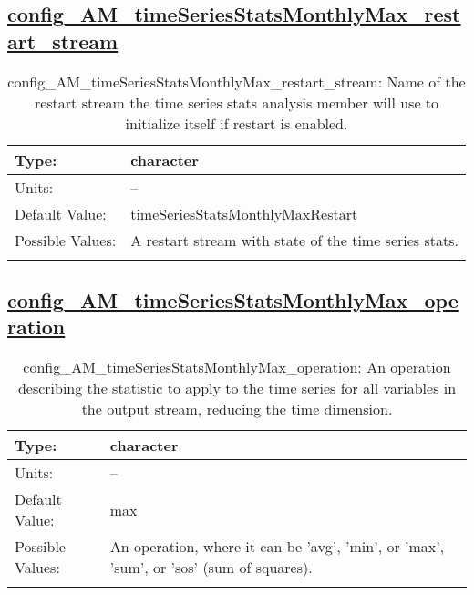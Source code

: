 \subsection[config\_AM\_timeSeriesStatsMonthlyMax\_restart\_stream]{\hyperref[sec:nm_tab_AM_timeSeriesStatsMonthlyMax]{config\_AM\_timeSeriesStatsMonthlyMax\_restart\_stream}}
\label{subsec:nm_sec_config_AM_timeSeriesStatsMonthlyMax_restart_stream}
\begin{center}
\begin{longtable}{| p{2.0in} || p{4.0in} |}
    \hline
    Type: & character \\
    \hline
    Units: & -- \\
    \hline
    Default Value: & timeSeriesStatsMonthlyMaxRestart \\
    \hline
    Possible Values: & A restart stream with state of the time series stats. \\
    \hline
    \caption{config\_AM\_timeSeriesStatsMonthlyMax\_restart\_stream: Name of the restart stream the time series stats analysis member will use to initialize itself if restart is enabled.}
\end{longtable}
\end{center}
\subsection[config\_AM\_timeSeriesStatsMonthlyMax\_operation]{\hyperref[sec:nm_tab_AM_timeSeriesStatsMonthlyMax]{config\_AM\_timeSeriesStatsMonthlyMax\_operation}}
\label{subsec:nm_sec_config_AM_timeSeriesStatsMonthlyMax_operation}
\begin{center}
\begin{longtable}{| p{2.0in} || p{4.0in} |}
    \hline
    Type: & character \\
    \hline
    Units: & -- \\
    \hline
    Default Value: & max \\
    \hline
    Possible Values: & An operation, where it can be 'avg', 'min', or 'max', 'sum', or 'sos' (sum of squares). \\
    \hline
    \caption{config\_AM\_timeSeriesStatsMonthlyMax\_operation: An operation describing the statistic to apply to the time series for all variables in the output stream, reducing the time dimension.}
\end{longtable}
\end{center}
